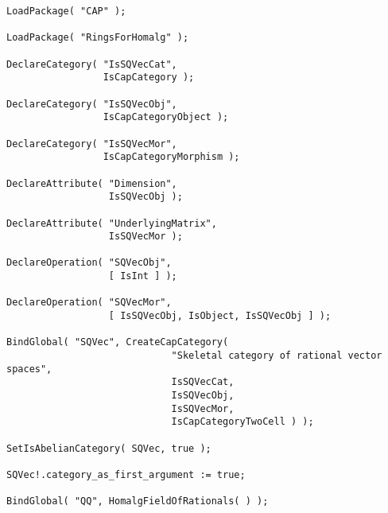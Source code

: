 \begin{small}
\begin{Verbatim}[frame=single]
LoadPackage( "CAP" );

LoadPackage( "RingsForHomalg" );

DeclareCategory( "IsSQVecCat",
                 IsCapCategory );

DeclareCategory( "IsSQVecObj",
                 IsCapCategoryObject );

DeclareCategory( "IsSQVecMor",
                 IsCapCategoryMorphism );

DeclareAttribute( "Dimension",
                  IsSQVecObj );

DeclareAttribute( "UnderlyingMatrix", 
                  IsSQVecMor );

DeclareOperation( "SQVecObj",
                  [ IsInt ] );

DeclareOperation( "SQVecMor",
                  [ IsSQVecObj, IsObject, IsSQVecObj ] );

BindGlobal( "SQVec", CreateCapCategory(
                             "Skeletal category of rational vector spaces",
                             IsSQVecCat,
                             IsSQVecObj,
                             IsSQVecMor,
                             IsCapCategoryTwoCell ) );

SetIsAbelianCategory( SQVec, true );

SQVec!.category_as_first_argument := true;

BindGlobal( "QQ", HomalgFieldOfRationals( ) );
\end{Verbatim}
\end{small}
